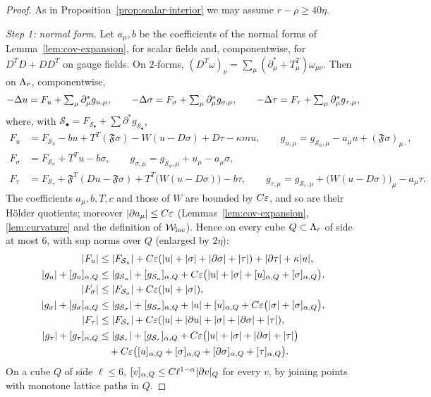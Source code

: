 \begin{proof}
As in Proposition~\ref{prop:scalar-interior} we may assume $r-\rho\ge40\eta$.

\emph{Step 1: normal form.} Let $a_\mu,b$ be the coefficients of the normal forms of Lemma~\ref{lem:cov-expansion}, for scalar fields and, componentwise, for $D^TD+DD^T$ on gauge fields. On $2$-forms, $(D^T\omega)_\nu=\sum_\mu(\partial^*_\mu+T^T_\mu)\omega_{\mu\nu}$. Then on $\Lambda_r$, componentwise,
\[
-\Delta u=F_u+\textstyle\sum_\mu\partial^*_\mu g_{u,\mu},\qquad-\Delta\sigma=F_\sigma+\sum_\mu\partial^*_\mu g_{\sigma,\mu},\qquad-\Delta\tau=F_\tau+\sum_\mu\partial^*_\mu g_{\tau,\mu},
\]
where, with $\mathcal S_\bullet=F_{\mathcal S_\bullet}+\sum\partial^*g_{\mathcal S_\bullet}$,
\[
\begin{aligned}
F_u&=F_{\mathcal S_u}-bu+T^T(\mathfrak F\sigma)-W(u-D\sigma)+D\tau-\kappa mu, \qquad g_{u,\mu}=g_{\mathcal S_u,\mu}-a_\mu u+(\mathfrak F\sigma)_{\mu\cdot},\\
F_\sigma&=F_{\mathcal S_\sigma}+T^Tu-b\sigma,\qquad g_{\sigma,\mu}=g_{\mathcal S_\sigma,\mu}+u_\mu-a_\mu\sigma,\\
F_\tau&=F_{\mathcal S_\tau}+\mathfrak F^T(Du-\mathfrak F\sigma)+T^T\big(W(u-D\sigma)\big)-b\tau,\qquad g_{\tau,\mu}=g_{\mathcal S_\tau,\mu}+\big(W(u-D\sigma)\big)_\mu-a_\mu\tau .
\end{aligned}
\]
The coefficients $a_\mu,b,T,c$ and those of $W$ are bounded by $C\varepsilon$, and so are their H\"older quotients; moreover $|\partial a_\mu|\le C\varepsilon$ (Lemmas~\ref{lem:cov-expansion}, \ref{lem:curvature} and the definition of $\mathcal W_{\rm loc}$). Hence on every cube $Q\subset\Lambda_r$ of side at most $6$, with sup norms over $Q$ (enlarged by $2\eta$):
\[
\begin{aligned}
|F_u|&\le|F_{\mathcal S_u}|+C\varepsilon(|u|+|\sigma|+|\partial\sigma|+|\tau|)+|\partial\tau|+\kappa|u|,\\
|g_u|+[g_u]_{\alpha,Q}&\le|g_{\mathcal S_u}|+[g_{\mathcal S_u}]_{\alpha,Q}+C\varepsilon\big(|u|+|\sigma|+[u]_{\alpha,Q}+[\sigma]_{\alpha,Q}\big),\\
|F_\sigma|&\le|F_{\mathcal S_\sigma}|+C\varepsilon(|u|+|\sigma|),\\
|g_\sigma|+[g_\sigma]_{\alpha,Q}&\le|g_{\mathcal S_\sigma}|+[g_{\mathcal S_\sigma}]_{\alpha,Q}+|u|+[u]_{\alpha,Q}+C\varepsilon\big(|\sigma|+[\sigma]_{\alpha,Q}\big),\\
|F_\tau|&\le|F_{\mathcal S_\tau}|+C\varepsilon(|u|+|\partial u|+|\sigma|+|\partial\sigma|+|\tau|),\\
|g_\tau|+[g_\tau]_{\alpha,Q}&\le|g_{\mathcal S_\tau}|+[g_{\mathcal S_\tau}]_{\alpha,Q}+C\varepsilon\big(|u|+|\sigma|+|\partial\sigma|+|\tau|\big)\\
&\quad+C\varepsilon\big([u]_{\alpha,Q}+[\sigma]_{\alpha,Q}+[\partial\sigma]_{\alpha,Q}+[\tau]_{\alpha,Q}\big).
\end{aligned}
\]
On a cube $Q$ of side $\ell\le6$, $[v]_{\alpha,Q}\le C\ell^{1-\alpha}|\partial v|_Q$ for every $v$, by joining points with monotone lattice paths in $Q$.


\end{proof}
